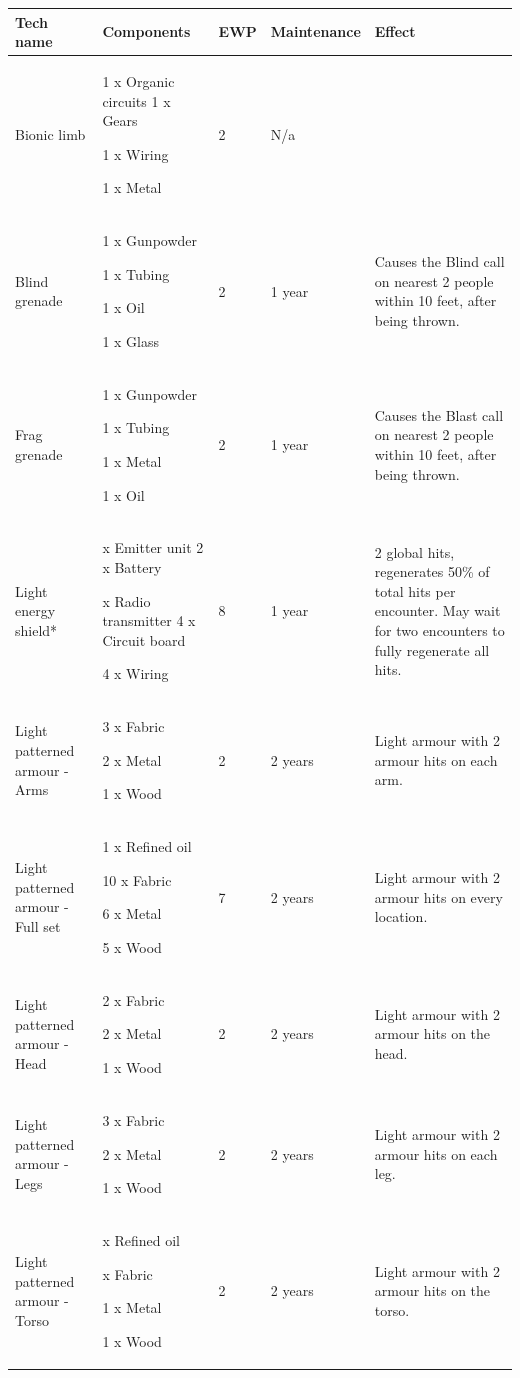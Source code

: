 \begin{table}
\begin{tabular}{|l|l|l|l|l|} \hline 
Tech name & Components & EWP & Maintenance & Effect \\
 \hline Bionic limb & 1 x Organic circuits 1 x Gears\par 1 x Wiring\par 1 x Metal & 2 & N/a &  \\
 \hline Blind grenade & 1 x Gunpowder\par 1 x Tubing\par 1 x Oil\par 1 x Glass & 2 & 1 year & Causes the Blind call on nearest 2 people within 10 feet, after being thrown. \\
 \hline Frag grenade & 1 x Gunpowder\par 1 x Tubing\par 1 x Metal\par 1 x Oil & 2 & 1 year & Causes the Blast call on nearest 2 people within 10 feet, after being thrown. \\
 \hline Light energy shield* & 

x Emitter unit 2 x Battery

x Radio transmitter 4 x Circuit board

4 x Wiring


 & 8 & 1 year & 2 global hits, regenerates 50\% of total hits per encounter. May wait for two encounters to fully regenerate all hits. \\
 \hline Light patterned armour - Arms & 3 x Fabric\par 2 x Metal\par 1 x Wood & 2 & 2 years & Light armour with 2 armour hits on each arm. \\
 \hline Light patterned armour - Full set & 1 x Refined oil\par 10 x Fabric\par 6 x Metal\par 5 x Wood & 7 & 2 years & Light armour with 2 armour hits on every location. \\
 \hline Light patterned armour - Head & 2 x Fabric\par 2 x Metal\par 1 x Wood & 2 & 2 years & Light armour with 2 armour hits on the head. \\
 \hline Light patterned armour - Legs & 3 x Fabric\par 2 x Metal\par 1 x Wood & 2 & 2 years & Light armour with 2 armour hits on each leg. \\
 \hline Light patterned armour - Torso &
x Refined oil

x Fabric

1 x Metal\par 1 x Wood & 2 & 2 years & Light armour with 2 armour hits on the torso. \\
 \hline \end{tabular}

\end{table}

